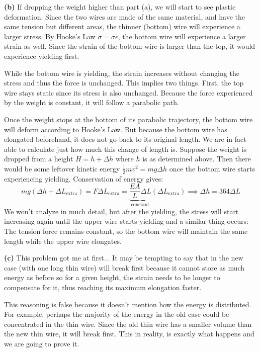 \documentclass{article}
\begin{document}
\textbf{(b)} If dropping the weight higher than part (a), we will start to see plastic deformation. Since the two wires are made of the same material, and have the same tension but different areas, the thinner (bottom) wire will experience a larger stress. By Hooke's Law $\sigma = \sigma \epsilon$, the bottom wire will experience a larger strain as well. Since the strain of the bottom wire is larger than the top, it would experience yielding first.
\vspace{2mm}

While the bottom wire is yielding, the strain increases without changing the stress and thus the force is unchanged. This implies two things. First, the top wire stays static since its stress is also unchanged. Because the force experienced by the weight is constant, it will follow a parabolic path.
\vspace{2mm}

Once the weight stops at the bottom of its parabolic trajectory, the bottom wire will deform according to Hooke's Law. But because the bottom wire has elongated beforehand, it does not go back to its original length. We are in fact able to calculate just how much this change of length is. Suppose the weight is dropped from a height $H=h+\Delta h$ where $h$ is as determined above. Then there would be some leftover kinetic energy $\frac{1}{2}mv^2=mg\Delta h$ once the bottom wire starts experiencing yielding. Conservation of energy gives:
\begin{equation}
    mg(\Delta h+\Delta L_\text{extra}) =F\Delta L_\text{extra} = \underbrace{\frac{EA}{L}\Delta L}_\text{constant}(\Delta L_\text{extra}) \implies \Delta h = 364\Delta L
    \label{eq:}
\end{equation}
We won't analyze in much detail, but after the yielding, the stress will start increasing again until the upper wire starts yielding and a similar thing occurs: The tension force remains constant, so the bottom wire will maintain the same length while the upper wire elongates.

\textbf{(c)} This problem got me at first... It may be tempting to say that in the new case (with one long thin wire) will break first because it cannot store as much energy as before so for a given height, the strain needs to be longer to compensate for it, thus reaching its maximum elongation faster.
\vspace{2mm}

This reasoning is false because it doesn't mention how the energy is distributed. For example, perhaps the majority of the energy in the old case could be concentrated in the thin wire. Since the old thin wire has a smaller volume than the new thin wire, it will break first. This in reality, is exactly what happens and we are going to prove it.
\vspace{2mm}
\end{document}
